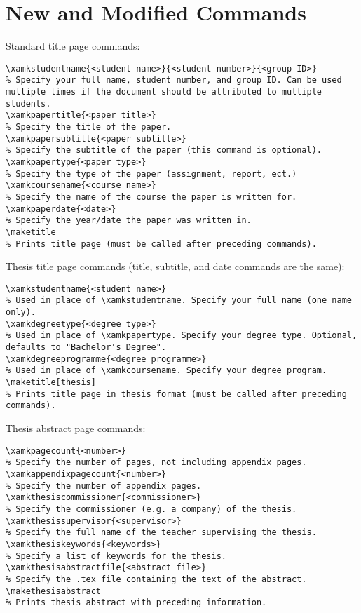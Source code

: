 \section{New and Modified Commands}

Standard title page commands:
\begin{verbatim}
\xamkstudentname{<student name>}{<student number>}{<group ID>}
% Specify your full name, student number, and group ID. Can be used multiple times if the document should be attributed to multiple students.
\xamkpapertitle{<paper title>}
% Specify the title of the paper.
\xamkpapersubtitle{<paper subtitle>}
% Specify the subtitle of the paper (this command is optional).
\xamkpapertype{<paper type>}
% Specify the type of the paper (assignment, report, ect.)
\xamkcoursename{<course name>}
% Specify the name of the course the paper is written for.
\xamkpaperdate{<date>}
% Specify the year/date the paper was written in.
\maketitle
% Prints title page (must be called after preceding commands).
\end{verbatim}
%
Thesis title page commands (title, subtitle, and date commands are the same):
\begin{verbatim}
\xamkstudentname{<student name>}
% Used in place of \xamkstudentname. Specify your full name (one name only).
\xamkdegreetype{<degree type>}
% Used in place of \xamkpapertype. Specify your degree type. Optional, defaults to "Bachelor's Degree".
\xamkdegreeprogramme{<degree programme>}
% Used in place of \xamkcoursename. Specify your degree program.
\maketitle[thesis]
% Prints title page in thesis format (must be called after preceding commands).
\end{verbatim}
%
Thesis abstract page commands:
\begin{verbatim}
\xamkpagecount{<number>}
% Specify the number of pages, not including appendix pages.
\xamkappendixpagecount{<number>}
% Specify the number of appendix pages.
\xamkthesiscommissioner{<commissioner>}
% Specify the commissioner (e.g. a company) of the thesis.
\xamkthesissupervisor{<supervisor>}
% Specify the full name of the teacher supervising the thesis.
\xamkthesiskeywords{<keywords>}
% Specify a list of keywords for the thesis.
\xamkthesisabstractfile{<abstract file>}
% Specify the .tex file containing the text of the abstract.
\makethesisabstract
% Prints thesis abstract with preceding information.
\end{verbatim}

